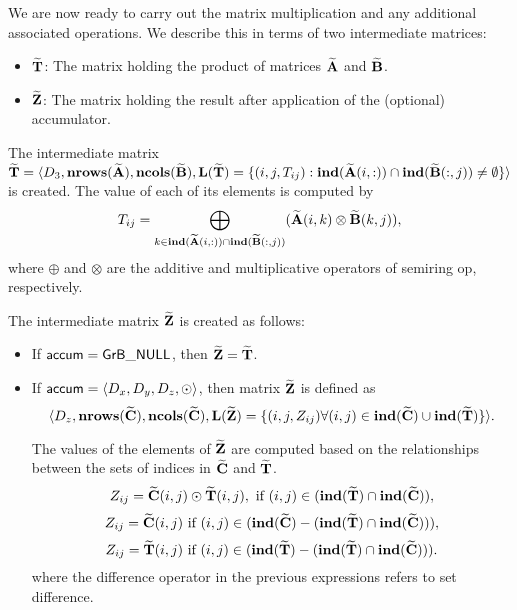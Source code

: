 %
%

We are now ready to carry out the matrix multiplication and any additional 
associated operations.  We describe this in terms of two intermediate matrices:
\begin{itemize}
    \item ${\bf \widetilde{T}}$: The matrix holding the product of matrices 
    ${\bf \widetilde{A}}$ and ${\bf \widetilde{B}}$.
    \item ${\bf \widetilde{Z}}$: The matrix holding the result after 
    application of the (optional) accumulator.
\end{itemize}

The intermediate matrix ${\bf \widetilde{T}} = \langle
D_3, \bold{nrows}({\bf \widetilde{A}}),
\bold{ncols}({\bf \widetilde{B}}), \bold{L}({\bf \widetilde{T}}) =
\{(i,j,T_{ij}) : \bold{ind}({\bf \widetilde{A}}(i,:)) \cap
\bold{ind}({\bf \widetilde{B}}(:,j)) \neq \emptyset \} \rangle$
is created.  The value of each of its elements is computed by \[T_{ij}
= \bigoplus_{k \in \bold{ind}({\bf \widetilde{A}}(i,:)) \cap
\bold{ind}({\bf \widetilde{B}}(:,j))} ({\bf \widetilde{A}}(i,k)
\otimes {\bf \widetilde{B}}(k,j)),\] where $\oplus$ and $\otimes$
are the additive and multiplicative operators of semiring {\sf op},
respectively.

The intermediate matrix ${\bf \widetilde{Z}}$ is created as follows:
\begin{itemize}
    \item If ${\sf accum} = {\sf GrB\_NULL}$, then ${\bf \widetilde{Z}} = {\bf \widetilde{T}}$.

    \item If ${\sf accum} = \langle D_x, D_y, D_z, \odot \rangle$, then matrix ${\bf \widetilde{Z}}$ is defined as 
        \[ \langle D_z, \bold{nrows}({\bf \widetilde{C}}), \bold{ncols}({\bf \widetilde{C}}),
        \bold{L}({\bf \widetilde{Z}}) 
		= \{(i,j,Z_{ij})  \forall (i,j) \in \bold{ind}({\bf \widetilde{C}}) \cup 
        \bold{ind}({\bf \widetilde{T}}) \} \rangle. \]

        The values of the elements of ${\bf \widetilde{Z}}$ are computed based on the 
        relationships between the sets of indices in ${\bf \widetilde{C}}$ and 
        ${\bf \widetilde{T}}$.
\[
Z_{ij} = {\bf \widetilde{C}}(i,j) \odot {\bf \widetilde{T}}(i,j), \ \mbox{if}\  (i,j) \in  (\bold{ind}({\bf \widetilde{T}}) \cap \bold{ind}({\bf \widetilde{C}})),
\]
\[
Z_{ij} = \matrix{\widetilde{C}}(i,j) \ \mbox{if}\  (i,j) \in  (\bold{ind}(\matrix{\widetilde{C}}) - (\bold{ind}(\matrix{\widetilde{T}}) \cap \bold{ind}(\matrix{\widetilde{C}}))),
\]
\[
Z_{ij} = \matrix{\widetilde{T}}(i,j) \ \mbox{if}\  (i,j) \in  (\bold{ind}(\matrix{\widetilde{T}}) - (\bold{ind}(\matrix{\widetilde{T}}) \cap \bold{ind}(\matrix{\widetilde{C}}))).
\]
where the difference operator in the previous expressions refers to set difference.
\end{itemize}

